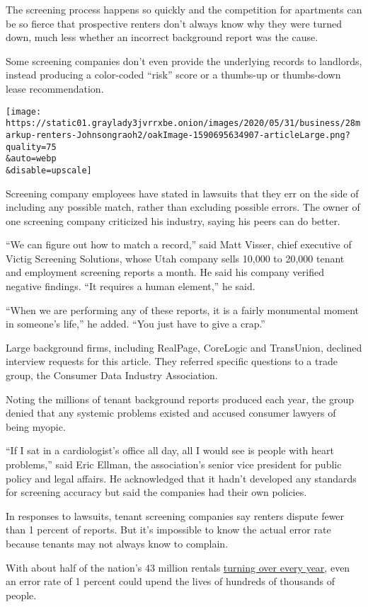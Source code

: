 The screening process happens so quickly and the competition for
apartments can be so fierce that prospective renters don't always know
why they were turned down, much less whether an incorrect background
report was the cause.

Some screening companies don't even provide the underlying records to
landlords, instead producing a color-coded ``risk'' score or a thumbs-up
or thumbs-down lease recommendation.

\texttt{[image: https://static01.graylady3jvrrxbe.onion/images/2020/05/31/business/28markup-renters-Johnsongraoh2/oakImage-1590695634907-articleLarge.png?quality=75\\\&auto=webp\\\&disable=upscale]}

Screening company employees have stated in lawsuits that they err on the
side of including any possible match, rather than excluding possible
errors. The owner of one screening company criticized his industry,
saying his peers can do better.

``We can figure out how to match a record,'' said Matt Visser, chief
executive of Victig Screening Solutions, whose Utah company sells 10,000
to 20,000 tenant and employment screening reports a month. He said his
company verified negative findings. ``It requires a human element,'' he
said.

``When we are performing any of these reports, it is a fairly monumental
moment in someone's life,'' he added. ``You just have to give a crap.''

Large background firms, including RealPage, CoreLogic and TransUnion,
declined interview requests for this article. They referred specific
questions to a trade group, the Consumer Data Industry Association.

Noting the millions of tenant background reports produced each year, the
group denied that any systemic problems existed and accused consumer
lawyers of being myopic.

``If I sat in a cardiologist's office all day, all I would see is people
with heart problems,'' said Eric Ellman, the association's senior vice
president for public policy and legal affairs. He acknowledged that it
hadn't developed any standards for screening accuracy but said the
companies had their own policies.

In responses to lawsuits, tenant screening companies say renters dispute
fewer than 1 percent of reports. But it's impossible to know the actual
error rate because tenants may not always know to complain.

With about half of the nation's 43 million rentals
\href{https://www.cbre.us/research-and-reports/US-Multifamily-Research-Brief---Apartment-Turnover-Rate-Continues-to-Fall-July-2019}{turning
over every year}, even an error rate of 1 percent could upend the lives
of hundreds of thousands of people.

